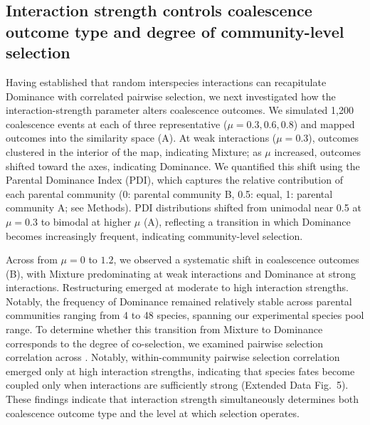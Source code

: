 \subsection{Interaction strength controls coalescence outcome type and degree of community-level selection}
\label{sec:results:interaction_strength}

Having established that random interspecies interactions can recapitulate Dominance with correlated pairwise selection, we next investigated how the interaction-strength parameter alters coalescence outcomes. We simulated 1,200 coalescence events at each of three representative  ($\mu = 0.3, 0.6, 0.8$) and mapped outcomes into the similarity space (A). At weak interactions ($\mu = 0.3$), outcomes clustered in the interior of the map, indicating Mixture; as $\mu$ increased, outcomes shifted toward the axes, indicating Dominance. We quantified this shift using the Parental Dominance Index (PDI), which captures the relative contribution of each parental community (0: parental community B, 0.5: equal, 1: parental community A; see Methods). PDI distributions shifted from unimodal near 0.5 at $\mu = 0.3$ to bimodal at higher $\mu$ (A), reflecting a transition in which Dominance becomes increasingly frequent, indicating community-level selection.

Across  from $\mu = 0$ to $1.2$, we observed a systematic shift in coalescence outcomes (B), with Mixture predominating at weak interactions and Dominance at strong interactions. Restructuring emerged at moderate to high interaction strengths.  Notably, the frequency of Dominance remained relatively stable across parental communities ranging from 4 to 48 species, spanning our experimental species pool range. To determine whether this transition from Mixture to Dominance corresponds to the degree of co-selection, we examined pairwise selection correlation across . Notably, within-community pairwise selection correlation emerged only at high interaction strengths, indicating that species fates become coupled only when interactions are sufficiently strong (Extended Data Fig.~5). These findings indicate that interaction strength simultaneously determines both coalescence outcome type and the level at which selection operates.

